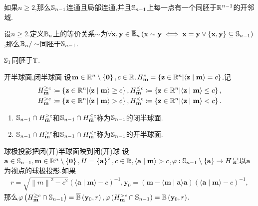 \begin{proposition}{}{}
	如果$n\geq 2$,那么$\S_{n-1}$连通且局部连通,并且$\S_{n-1}$上每一点有一个同胚于$\R^{n-1}$的开邻域.
\end{proposition}

\begin{corollary}{}{}
	设$n\geq 2$.定义$\B_{n}$上的等价关系$\sim$为$\forall\mathbf{x},\mathbf{y}\in\overline{\B}_{n}\left(\mathbf{x}\sim\mathbf{y}\iff \mathbf{x}=\mathbf{y}\vee\left\{\mathbf{x},\mathbf{y}\right\}\subseteq\S_{n-1}\right)$,那么$\B_{n}/\sim$同胚于$\S_{n-1}$.
\end{corollary}

\begin{corollary}{}{}
	$\S_{1}$同胚于$\T$.
\end{corollary}

\begin{definition}{开半球面,闭半球面}{}
	设$\mathbf{m}\in\R^{n}\setminus\left\{\mathbf{0}\right\},c\in\R,H_{\mathbf{m}}^{c}=\left\{\mathbf{z}\in\R^{n}\middle|\langle\mathbf{z}\mid\mathbf{m}\rangle=c\right\}$.记
	\begin{gather*}
		H_{\mathbf{m}}^{\geq c}\coloneq\left\{\mathbf{z}\in\R^{n}\middle|\langle\mathbf{z}\mid\mathbf{m}\rangle\geq c\right\},
		H_{\mathbf{m}}^{\leq c}\coloneq\left\{\mathbf{z}\in\R^{n}\middle|\langle\mathbf{z}\mid\mathbf{m}\rangle\leq c\right\},\\
		H_{\mathbf{m}}^{>c}\coloneq\left\{\mathbf{z}\in\R^{n}\middle|\langle\mathbf{z}\mid\mathbf{m}\rangle >c\right\},
		H_{\mathbf{m}}^{<c}\coloneq\left\{\mathbf{z}\in\R^{n}\middle|\langle\mathbf{z}\mid\mathbf{m}\rangle <c\right\}.
	\end{gather*}
	\begin{enumerate}
		\item $\S_{n-1}\cap H_{\mathbf{m}}^{\geq c}$和$\S_{n-1}\cap H_{\mathbf{m}}^{\leq c}$称为$\S_{n-1}$的闭半球面.
		\item $\S_{n-1}\cap H_{\mathbf{m}}^{>c}$和$\S_{n-1}\cap H_{\mathbf{m}}^{<c}$称为$\S_{n-1}$的开半球面.
	\end{enumerate}
\end{definition}

\begin{proposition}{球极投影把闭(开)半球面映到闭(开)球}{}
	设$\mathbf{a}\in\S_{n-1},\mathbf{m}\in\R^{n}\setminus\left\{\mathbf{0}\right\},H=\left\{\mathbf{a}\right\}^{\circ},c\in\R,\langle\mathbf{a}\mid\mathbf{m}\rangle>c$,$\varphi:\S_{n-1}\setminus\left\{\mathbf{a}\right\}\to H$是以$\mathbf{a}$为视点的球极投影.如果
	\begin{align*}
		r=\sqrt{\left\|m\right\|^{2}-c^{2}}\left(\langle\mathbf{a}\mid\mathbf{m}\rangle-c\right)^{-1},\mathbf{y}_{0}=\left(\mathbf{m}-\langle\mathbf{m}\mid\mathbf{a}\rangle\mathbf{a}\right)\left(\langle\mathbf{a}\mid\mathbf{m}\rangle-c\right)^{-1},
	\end{align*}
	那么$\varphi\left(H_{\mathbf{m}}^{\geq c}\cap\S_{n-1}\right)=\overline{\B}\left(\mathbf{y}_{0},r\right),\varphi\left(H_{\mathbf{m}}^{>c}\cap\S_{n-1}\right)=\B\left(\mathbf{y}_{0},r\right)$.
\end{proposition}